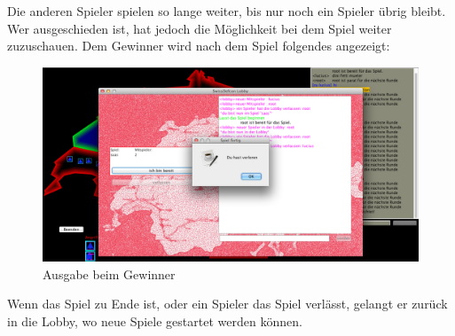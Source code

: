 \documentclass[ngerman, 12pt, pdftex]{scrartcl}[2006/07/30]
\begin{document}
Die anderen Spieler spielen so lange weiter, bis nur noch ein Spieler übrig bleibt. Wer ausgeschieden ist, hat jedoch die Möglichkeit bei dem Spiel weiter zuzuschauen.
Dem Gewinner wird nach dem Spiel folgendes angezeigt:

\begin{figure}[h]
\centering
\includegraphics[scale=0.29]{spiel/gewonnen.png}
\caption{Ausgabe beim Gewinner}
\end{figure}

Wenn das Spiel zu Ende ist, oder ein Spieler das Spiel verlässt, gelangt er zurück in die Lobby, wo neue Spiele gestartet werden können.
\end{document}
